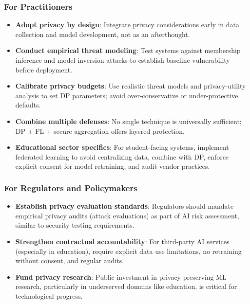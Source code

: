 \documentclass[11pt,a4paper]{article}
\begin{document}
\subsubsection{For Practitioners}

\begin{itemize}
\item \textbf{Adopt privacy by design}: Integrate privacy considerations early in data collection and model development, not as an afterthought.

\item \textbf{Conduct empirical threat modeling}: Test systems against membership inference and model inversion attacks to establish baseline vulnerability before deployment.

\item \textbf{Calibrate privacy budgets}: Use realistic threat models and privacy-utility analysis to set DP parameters; avoid over-conservative or under-protective defaults.

\item \textbf{Combine multiple defenses}: No single technique is universally sufficient; DP + FL + secure aggregation offers layered protection.

\item \textbf{Educational sector specifics}: For student-facing systems, implement federated learning to avoid centralizing data, combine with DP, enforce explicit consent for model retraining, and audit vendor practices.
\end{itemize}

\subsubsection{For Regulators and Policymakers}

\begin{itemize}
\item \textbf{Establish privacy evaluation standards}: Regulators should mandate empirical privacy audits (attack evaluations) as part of AI risk assessment, similar to security testing requirements.

\item \textbf{Strengthen contractual accountability}: For third-party AI services (especially in education), require explicit data use limitations, no retraining without consent, and regular audits.

\item \textbf{Fund privacy research}: Public investment in privacy-preserving ML research, particularly in underserved domains like education, is critical for technological progress.
\end{itemize}
\end{document}
